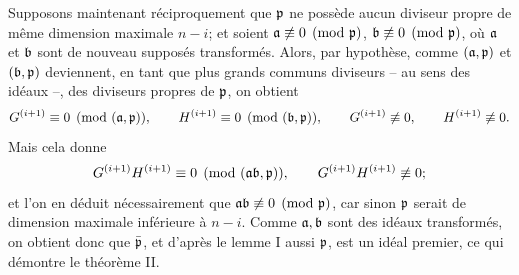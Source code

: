 Supposons maintenant réciproquement que $\mathfrak p$ ne possède aucun diviseur propre de même dimension maximale $n-i$; et soient $\mathfrak a\not\equiv0\pmod{\mathfrak p}$, $\mathfrak b\not\equiv0\pmod{\mathfrak p}$, où $\mathfrak a$ et $\mathfrak b$ sont de nouveau supposés transformés. Alors, par hypothèse, comme $(\mathfrak a,\mathfrak p)$ et $(\mathfrak b,\mathfrak p)$ deviennent, en tant que plus grands communs diviseurs -- au sens des idéaux --, des diviseurs propres de $\mathfrak p$, on obtient
\[
 G^{(i+1)}\equiv0\pmod{(\mathfrak a,\mathfrak p)},\qquad
 H^{(i+1)}\equiv0\pmod{(\mathfrak b,\mathfrak p)},\qquad
 G^{(i+1)}\not\equiv0,\qquad
 H^{(i+1)}\not\equiv0.
\]
Mais cela donne
\[
 G^{(i+1)}H^{(i+1)}\equiv0\pmod{(\mathfrak a\mathfrak b,\mathfrak p)},\qquad
 G^{(i+1)}H^{(i+1)}\not\equiv0;
\]
et l'on en déduit nécessairement que $\mathfrak a\mathfrak b\not\equiv0\pmod{\mathfrak p}$, car sinon $\mathfrak p$ serait de dimension maximale inférieure à $n-i$. Comme $\mathfrak a,\mathfrak b$ sont des idéaux transformés, on obtient donc que $\bar{\mathfrak p}$, et d'après le lemme I aussi $\mathfrak p$, est un idéal premier, ce qui démontre le théorème II.
